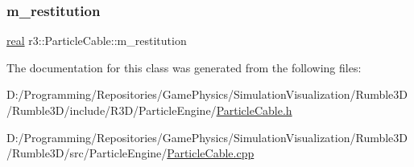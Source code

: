 \mbox{\label{classr3_1_1_particle_cable_ad03466bf1aeecddec5fd0319be7b2e3d}} 
\subsubsection{\texorpdfstring{m\+\_\+restitution}{m\_restitution}}
{\footnotesize\ttfamily \mbox{\hyperlink{namespacer3_ab2016b3e3f743fb735afce242f0dc1eb}{real}} r3\+::\+Particle\+Cable\+::m\+\_\+restitution\hspace{0.3cm}{\ttfamily [protected]}}



The documentation for this class was generated from the following files\+:\begin{DoxyCompactItemize}
\item 
D\+:/\+Programming/\+Repositories/\+Game\+Physics/\+Simulation\+Visualization/\+Rumble3\+D/\+Rumble3\+D/include/\+R3\+D/\+Particle\+Engine/\mbox{\hyperlink{_particle_cable_8h}{Particle\+Cable.\+h}}\item 
D\+:/\+Programming/\+Repositories/\+Game\+Physics/\+Simulation\+Visualization/\+Rumble3\+D/\+Rumble3\+D/src/\+Particle\+Engine/\mbox{\hyperlink{_particle_cable_8cpp}{Particle\+Cable.\+cpp}}\end{DoxyCompactItemize}
